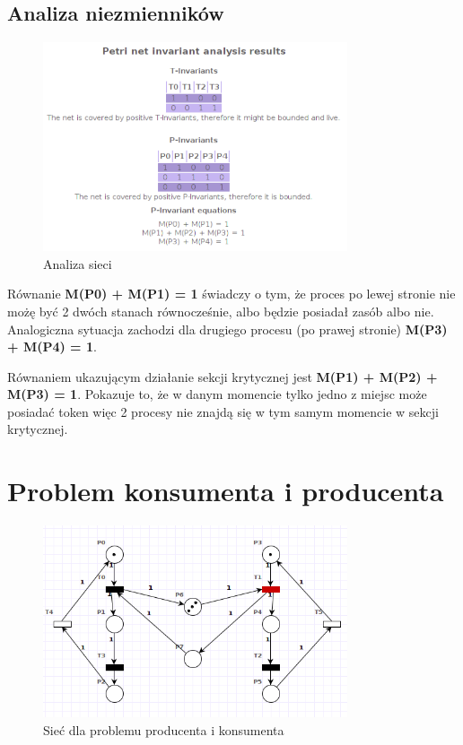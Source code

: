 \documentclass{article}
\begin{document}
\subsection{Analiza niezmienników}
\begin{figure}[H]
    \centering
    \includegraphics[width=0.8\textwidth, height=0.4\textheight]{zad3_analiza.png}
    \caption{Analiza sieci}
\end{figure}

Równanie \textbf{M(P0) + M(P1) = 1} świadczy o tym, że proces po lewej stronie
nie możę być 2 dwóch stanach równocześnie, albo będzie 
posiadał zasób albo nie. \\
Analogiczna sytuacja zachodzi dla drugiego procesu (po prawej stronie)
\textbf{M(P3) + M(P4) = 1}.

Równaniem ukazującym działanie sekcji krytycznej jest 
\textbf{M(P1) + M(P2) + M(P3) = 1}. 
Pokazuje to, że w danym momencie tylko jedno z miejsc 
może posiadać token więc 2 procesy nie znajdą się w tym samym momencie w sekcji krytycznej. 

\section{Problem konsumenta i producenta}
\begin{figure}[H]
    \centering
    \includegraphics[width=0.8\textwidth, height=0.4\textheight]{zad4.png}
    \caption{Sieć dla problemu producenta i konsumenta}
\end{figure}
\end{document}
